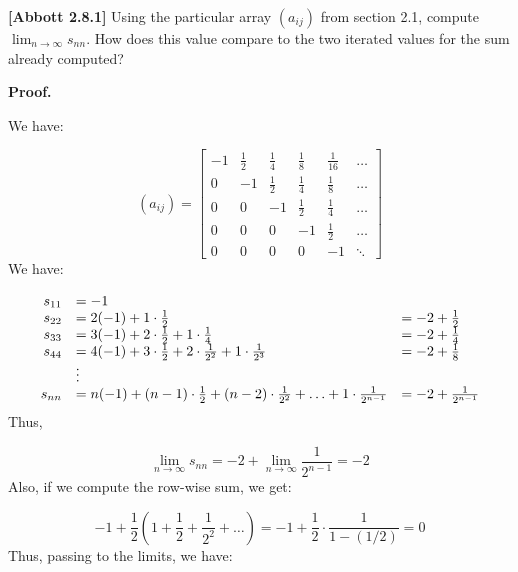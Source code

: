 \documentclass[10pt]{article}
\begin{document}
\textbf{[Abbott 2.8.1]} Using the particular array $\displaystyle ( a_{ij})$ from section 2.1, compute $\displaystyle \lim _{n\rightarrow \infty } s_{nn}$. How does this value compare to the two iterated values for the sum already computed?



\textbf{Proof. }



We have:


\begin{equation*}
( a_{ij}) =\begin{bmatrix}
-1 & \frac{1}{2} & \frac{1}{4} & \frac{1}{8} & \frac{1}{16} & \dotsc \\
0 & -1 & \frac{1}{2} & \frac{1}{4} & \frac{1}{8} & \dotsc \\
0 & 0 & -1 & \frac{1}{2} & \frac{1}{4} & \dotsc \\
0 & 0 & 0 & -1 & \frac{1}{2} & \dotsc \\
0 & 0 & 0 & 0 & -1 & \ddots 
\end{bmatrix}
\end{equation*}
We have:


\begin{equation*}
\begin{array}{ r l l }
s_{11} & =-1 & \\
s_{22} & =2( -1) +1\cdot \frac{1}{2} & =-2+\frac{1}{2}\\
s_{33} & =3( -1) +2\cdot \frac{1}{2} +1\cdot \frac{1}{4} & =-2+\frac{1}{4}\\
s_{44} & =4( -1) +3\cdot \frac{1}{2} +2\cdot \frac{1}{2^{2}} +1\cdot \frac{1}{2^{3}} & =-2+\frac{1}{8}\\
 & \vdots  & \\
s_{nn} & =n( -1) +( n-1) \cdot \frac{1}{2} +( n-2) \cdot \frac{1}{2^{2}} +\dotsc +1\cdot \frac{1}{2^{n-1}} & =-2+\frac{1}{2^{n-1}}
\end{array}
\end{equation*}
Thus, 


\begin{equation*}
\lim _{n\rightarrow \infty } s_{nn} =-2+\lim _{n\rightarrow \infty }\frac{1}{2^{n-1}} =-2
\end{equation*}
Also, if we compute the row-wise sum, we get:


\begin{equation*}
-1+\frac{1}{2}\left( 1+\frac{1}{2} +\frac{1}{2^{2}} +\dotsc \right) =-1+\frac{1}{2} \cdot \frac{1}{1-( 1/2)} =0
\end{equation*}
Thus, passing to the limits, we have:
\end{document}
